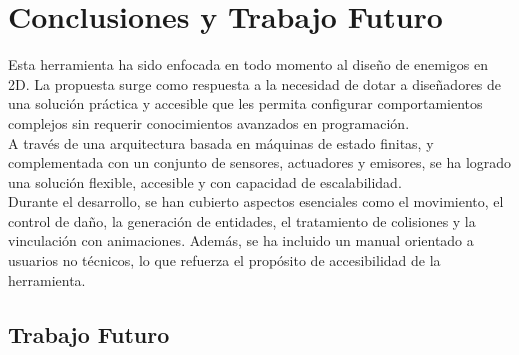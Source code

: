 \chapter{Conclusiones y Trabajo Futuro}
\label{cap:conclusiones}

Esta herramienta ha sido enfocada en todo momento al diseño de enemigos en 2D.  La propuesta surge como respuesta a la necesidad de dotar a diseñadores de una solución práctica y accesible que les permita configurar comportamientos complejos sin requerir conocimientos avanzados en programación.\\
A través de una arquitectura basada en máquinas de estado finitas, y complementada con un conjunto de sensores, actuadores y emisores, se ha logrado una solución flexible, accesible y con capacidad de escalabilidad.\\
Durante el desarrollo, se han cubierto aspectos esenciales como el movimiento, el control de daño, la generación de entidades, el tratamiento de colisiones y la vinculación con animaciones. Además, se ha incluido un manual orientado a usuarios no técnicos, lo que refuerza el propósito de accesibilidad de la herramienta.


\section{Trabajo Futuro}

